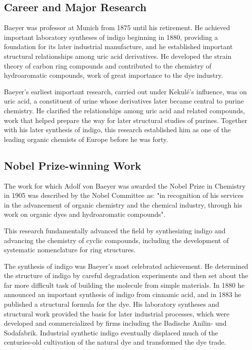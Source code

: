 \subsection*{Career and Major Research}

Baeyer was professor at Munich from 1875 until his retirement. He achieved important laboratory syntheses of indigo beginning in 1880, providing a foundation for its later industrial manufacture, and he established important structural relationships among uric acid derivatives. He developed the strain theory of carbon ring compounds and contributed to the chemistry of hydroaromatic compounds, work of great importance to the dye industry.

Baeyer's earliest important research, carried out under Kekulé's influence, was on uric acid, a constituent of urine whose derivatives later became central to purine chemistry. He clarified the relationships among uric acid and related compounds, work that helped prepare the way for later structural studies of purines. Together with his later synthesis of indigo, this research established him as one of the leading organic chemists of Europe before he was forty.

\subsection*{Nobel Prize-winning Work}

The work for which Adolf von Baeyer was awarded the Nobel Prize in Chemistry in 1905 was described by the Nobel Committee as: "in recognition of his services in the advancement of organic chemistry and the chemical industry, through his work on organic dyes and hydroaromatic compounds".

This research fundamentally advanced the field by synthesizing indigo and advancing the chemistry of cyclic compounds, including the development of systematic nomenclature for ring structures.

The synthesis of indigo was Baeyer's most celebrated achievement. He determined the structure of indigo by careful degradation experiments and then set about the far more difficult task of building the molecule from simple materials. In 1880 he announced an important synthesis of indigo from cinnamic acid, and in 1883 he published a structural formula for the dye. His laboratory syntheses and structural work provided the basis for later industrial processes, which were developed and commercialized by firms including the Badische Anilin- und Sodafabrik. Industrial synthetic indigo eventually displaced much of the centuries-old cultivation of the natural dye and transformed the dye trade.

